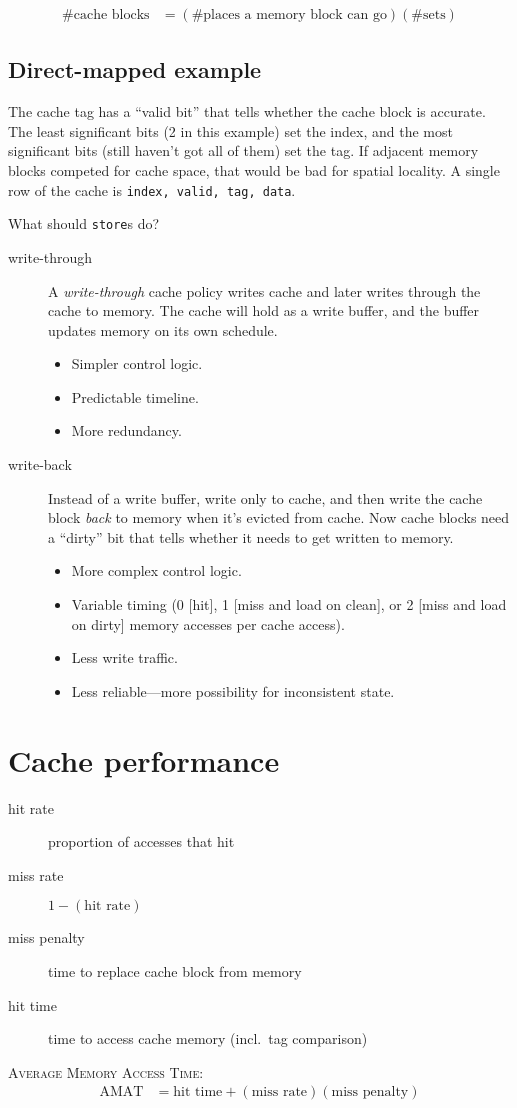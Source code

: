 \begin{align}
	\text{\# cache blocks} &= \left(\text{\# places a memory block can go}\right) \left(\text{\# sets}\right)
\end{align}

\subsection{Direct-mapped example}
The cache tag has a ``valid bit'' that tells whether the cache block is accurate.
The least significant bits (2 in this example) set the index, and the most significant bits
(still haven't got all of them)
set the tag. If adjacent memory blocks competed for cache space, that would be bad for spatial locality. A single row of the cache is \texttt{index, valid, tag, data}.

What should \texttt{store}s do?
\begin{description}
	\item[write-through] A \emph{write-through} cache policy writes cache and later writes through the cache to memory.
	The cache will hold as a write buffer, and the buffer updates memory on its own schedule.
		\begin{itemize}
			\item Simpler control logic.
			\item Predictable timeline.
			\item More redundancy.
		\end{itemize}
	\item[write-back] Instead of a write buffer, write only to cache, and then write the cache block \emph{back} to memory when it's evicted from cache. Now cache blocks need a ``dirty'' bit that tells whether it needs to get written to memory.
		\begin{itemize}
			\item More complex control logic.
			\item Variable timing (0 [hit], 1 [miss and load on clean], or 2 [miss and load on dirty] memory accesses per cache access).
			\item Less write traffic.
			\item Less reliable---more possibility for inconsistent state.
		\end{itemize}
\end{description}

\section{Cache performance}
\begin{description}
	\item[hit rate] proportion of accesses that hit
	\item[miss rate] \(1 - \left(\text{hit rate}\right)\)
	\item[miss penalty] time to replace cache block from memory
	\item[hit time] time to access cache memory (incl.~tag comparison)
\end{description}
\textsc{Average Memory Access Time}:
\begin{align}
\text{AMAT} &= \text{hit time} + \left(\text{miss rate}\right)\left(\text{miss penalty}\right)
\end{align}
